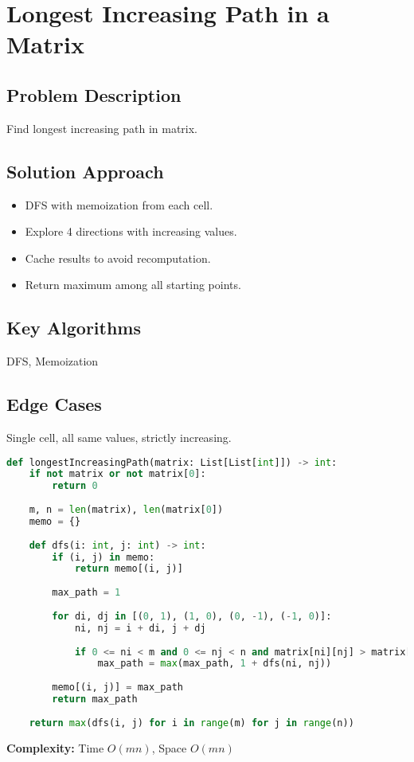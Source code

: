 \documentclass[10pt, a4paper]{article}
\begin{document}
\section{Longest Increasing Path in a Matrix}
\subsection*{Problem Description}
Find longest increasing path in matrix.

\subsection*{Solution Approach}
\begin{itemize}
    \item DFS with memoization from each cell.
    \item Explore 4 directions with increasing values.
    \item Cache results to avoid recomputation.
    \item Return maximum among all starting points.
\end{itemize}

\subsection*{Key Algorithms}
DFS, Memoization

\subsection*{Edge Cases}
Single cell, all same values, strictly increasing.

\begin{lstlisting}[language=Python]
def longestIncreasingPath(matrix: List[List[int]]) -> int:
    if not matrix or not matrix[0]:
        return 0
    
    m, n = len(matrix), len(matrix[0])
    memo = {}
    
    def dfs(i: int, j: int) -> int:
        if (i, j) in memo:
            return memo[(i, j)]
        
        max_path = 1
        
        for di, dj in [(0, 1), (1, 0), (0, -1), (-1, 0)]:
            ni, nj = i + di, j + dj
            
            if 0 <= ni < m and 0 <= nj < n and matrix[ni][nj] > matrix[i][j]:
                max_path = max(max_path, 1 + dfs(ni, nj))
        
        memo[(i, j)] = max_path
        return max_path
    
    return max(dfs(i, j) for i in range(m) for j in range(n))
\end{lstlisting}
\textbf{Complexity:} Time $O(mn)$, Space $O(mn)$
\end{document}
